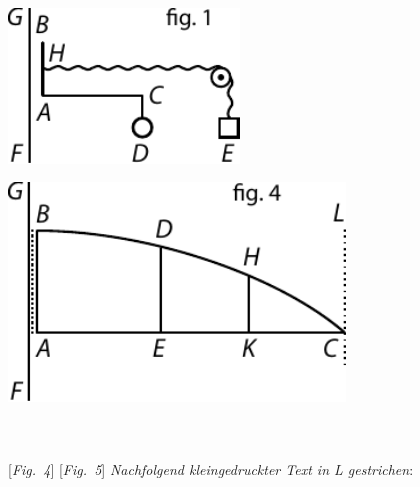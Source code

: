  \vspace{2.0em} 
\pstart
\hspace{3mm}
\begin{minipage}[t]{0.5\textwidth}
\includegraphics[width=0.46\textwidth]{gesamttex/edit_VIII,3/images/LH_37_03_073-074_d04.pdf}
\end{minipage}
\begin{minipage}[t]{0.5\textwidth}
\includegraphics[width=0.67\textwidth]{gesamttex/edit_VIII,3/images/LH_37_03_073-074_d05.pdf}
\end{minipage}
\\
\\\label{LH_37_03_073v_Fig.4}\label{LH_37_03_073v_Fig.5}
\vspace{-0.3em}
\hspace*{19mm} [\textit{Fig.~4}]\hspace*{64mm} [\textit{Fig.~5}]%
\pend
\newpage%
\count{}
\count{}
\count{}
\pstart%
\noindent%
\lbrack\textit{Nachfolgend kleingedruckter Text in L gestrichen}:\rbrack\
